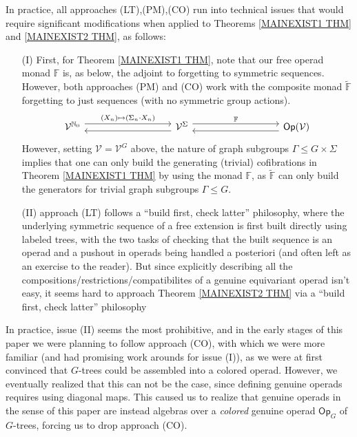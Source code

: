 \documentclass{article}
\begin{document}
\begin{itemize}
In practice, all approaches (LT),(PM),(CO)
run into technical issues 
that would require significant modifications 
when applied to Theorems 
\ref{MAINEXIST1 THM} and \ref{MAINEXIST2 THM},
as follows:
\begin{itemize}
\item[(I)]
First, for Theorem
\ref{MAINEXIST1 THM},
note that our free operad monad $\mathbb{F}$
is, as below, the adjoint to forgetting to symmetric sequences.
However, both approaches
(PM) and (CO) work with the composite monad 
$\widetilde{\mathbb{F}}$
forgetting to just sequences (with no symmetric group actions).
\begin{equation}
\begin{tikzcd}[column sep =9em]
	\mathcal{V}^{\mathbb{N}_0}
	\ar[shift left=1.5]{r}
	{(X_n) \mapsto
	(\Sigma_n \cdot X_n)}
&
	\mathcal{V}^{\Sigma} 
	\arrow[l, shift left=1.5] 
	\arrow[r, shift left=1.5,swap,"\mathbb{F}"']
&
	\mathsf{Op}(\mathcal{V})
	\ar[shift left=1.5]{l}
\end{tikzcd}
\end{equation}
However, setting $\mathcal{V}=\mathcal{V}^G$ above,
the nature of graph subgroups $\Gamma \leq G \times \Sigma$ implies that
one can only build the generating (trivial) cofibrations in 
Theorem \ref{MAINEXIST1 THM} by using the monad $\mathbb{F}$,
as $\widetilde{\mathbb{F}}$ can only build the generators for trivial graph subgroups $\Gamma \leq G$.
\item[(II)] approach (LT) follows a 
``build first, check latter'' philosophy, 
where the underlying symmetric sequence of a free extension is first built directly using labeled trees, 
with the two tasks of checking that the built sequence is
an operad and a pushout in operads
being handled a posteriori (and often left as an exercise to the reader). 
But since explicitly describing all the compositions/restrictions/compatibilites
of a genuine equivariant operad isn't easy,
it seems hard to approach 
Theorem \ref{MAINEXIST2 THM}
via a ``build first, check latter'' philosophy
\end{itemize}

In practice, issue (II) seems the most prohibitive,
and in the early stages of this paper
we were planning to follow approach (CO),
with which we were more familiar 
(and had promising work arounds for issue (I)), 
as we were at first convinced that $G$-trees
could be assembled into a colored operad.
However, we eventually realized that this can not be the case, since defining genuine operads requires using diagonal maps.
This caused us to realize that genuine operads in the sense of this paper are instead algebras
over a \emph{colored} genuine operad $\mathsf{Op}_G$ of $G$-trees,
forcing us to drop approach (CO).


\end{itemize}
\end{document}
